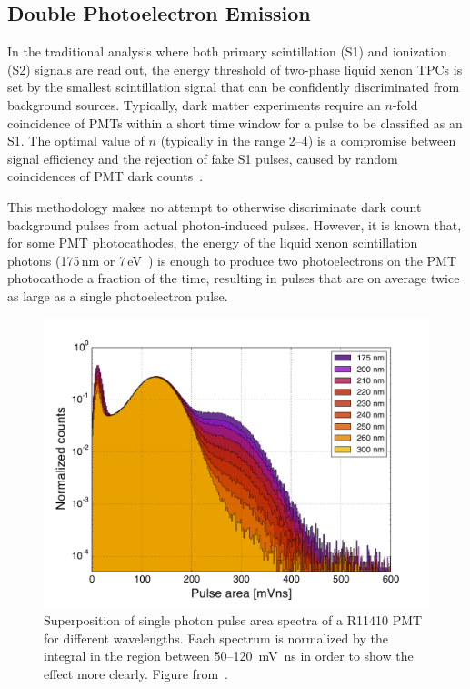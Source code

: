 \subsection{Double Photoelectron Emission}\label{sec:dpe}

In the traditional analysis where both primary scintillation (S1) and ionization (S2) signals are read out, the energy threshold of two-phase liquid xenon TPCs is set by the smallest scintillation signal that can be confidently discriminated from background sources. Typically, dark matter experiments require an $n$-fold coincidence of PMTs within a short time window for a pulse to be classified as an S1. The optimal value of $n$ (typically in the range 2--4) is a compromise between signal efficiency and the rejection of fake S1 pulses, caused by random coincidences of PMT dark counts~\cite{Aprile:2020thb}.

This methodology makes no attempt to otherwise discriminate dark count background pulses from actual photon-induced pulses. However, it is known that, for some PMT photocathodes, the energy of the liquid xenon scintillation photons (175\,nm or 7\,eV~\cite{Fuji:2015}) is enough to produce two photoelectrons on the PMT photocathode a fraction of the time, resulting in pulses that are on average twice as large as a single photoelectron pulse.

\begin{figure}[!htbp]  
\begin{center}
\includegraphics[width=0.99\columnwidth]{fig_R11410_rainbow_plot.pdf}
\caption{Superposition of single photon pulse area spectra of a R11410 PMT for different wavelengths. Each spectrum is normalized by the integral in the region between 50--120~mV~ns in order to show the effect more clearly. Figure from~\cite{Faham:2015kqa}.}
\label{fig:R11410_rainbow_plot}
\end{center} 
\end{figure}

